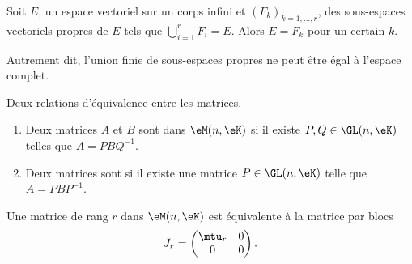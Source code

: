 \begin{proposition}   \label{PropTVKbxU}
    Soit \( E\), un espace vectoriel sur un corps infini et \( (F_k)_{k=1,\ldots, r}\), des sous-espaces vectoriels propres de \( E\) tels que \( \bigcup_{i=1}^rF_i=E\). Alors \( E=F_k\) pour un certain \( k\).

    Autrement dit, l'union finie de sous-espaces propres ne peut être égal à l'espace complet.
\end{proposition}

\begin{definition}  \label{DefBLELooTvlHoB}
    Deux relations d'équivalence entre les matrices.
    \begin{enumerate}
        \item   \label{ItemPFXCooOUbSCt}
    Deux matrices \( A\) et \( B\) sont  dans \( \eM(n,\eK)\) si il existe \( P,Q\in\GL(n,\eK)\) telles que \( A=PBQ^{-1}\). 
\item
    Deux matrices sont  si il existe une matrice \( P\in \GL(n,\eK)\) telle que \( A=PBP^{-1}\).
    \end{enumerate}
\end{definition}

\begin{lemma}   \label{LemZMxxnfM}
    Une matrice de rang \( r\) dans \( \eM(n,\eK)\) est équivalente à la matrice par blocs
    \begin{equation}
        J_r=\begin{pmatrix}
            \mtu_r    &   0    \\ 
            0    &   0    
        \end{pmatrix}.
    \end{equation}
\end{lemma}

